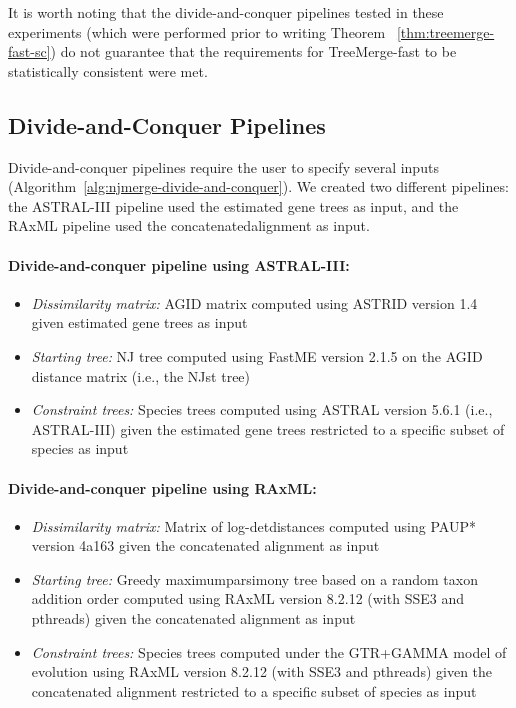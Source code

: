 It is worth noting that the divide-and-conquer pipelines tested in these experiments (which were performed prior to writing Theorem ~\ref{thm:treemerge-fast-sc}) do not guarantee that the requirements for TreeMerge-fast to be statistically consistent were met.

\subsection{Divide-and-Conquer Pipelines }
\label{sec:specific-pipeline}
Divide-and-conquer pipelines require the user to specify several inputs (Algorithm~\ref{alg:njmerge-divide-and-conquer}).
We created two different pipelines: the ASTRAL-III pipeline used the estimated gene trees as input, and the RAxML pipeline used the \gls{concatenatedalignment} as input.

\paragraph{Divide-and-conquer pipeline using ASTRAL-III:}
\begin{itemize}
	\item {\em Dissimilarity matrix:} AGID matrix computed using \gls{ASTRID} version 1.4 given estimated gene trees as input
	\item {\em Starting tree:} NJ tree computed using  \gls{FastME}  version 2.1.5 on the AGID distance matrix (i.e., the \gls{NJst} tree)
	\item {\em Constraint trees:} Species trees computed using ASTRAL version 5.6.1 (i.e., ASTRAL-III) given the estimated gene trees restricted to a specific subset of species as input
\end{itemize}

\paragraph{Divide-and-conquer pipeline using RAxML:}
\begin{itemize}
	\item {\em Dissimilarity matrix: } Matrix of \glspl{log-detdistance} computed using \gls{PAUP*} version 4a163 given the concatenated alignment as input
	\item {\em Starting tree: } Greedy \gls{maximumparsimony} tree based on a random taxon addition order computed using RAxML version 8.2.12 (with SSE3 and pthreads) given the concatenated alignment as input
	\item {\em Constraint trees: } Species trees computed under the \gls{GTR+GAMMA} model of evolution using RAxML version 8.2.12 (with SSE3 and pthreads) given the concatenated alignment restricted to a specific subset of species as input
\end{itemize}

